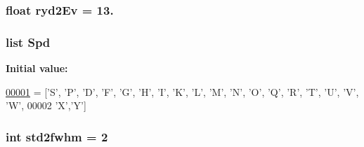 \subsubsection[{ryd2\+Ev}]{\setlength{\rightskip}{0pt plus 5cm}float ryd2\+Ev = 13.}\label{namespacepyneb_1_1utils_1_1__chianti__constants_a4b8a72e56d44f645b21c60a53b8a7c22}
\hypertarget{namespacepyneb_1_1utils_1_1__chianti__constants_aca66e52cd26761ab6aa375f99100d7c3}{}
\subsubsection[{Spd}]{\setlength{\rightskip}{0pt plus 5cm}list Spd}\label{namespacepyneb_1_1utils_1_1__chianti__constants_aca66e52cd26761ab6aa375f99100d7c3}
{\bfseries Initial value\+:}
\begin{DoxyCode}
\hypertarget{namespacepyneb_1_1utils_1_1__chianti__constants_l00001}{}\hyperlink{namespacepyneb_1_1utils_1_1__chianti__constants}{00001} = [\textcolor{stringliteral}{'S'}, \textcolor{stringliteral}{'P'}, \textcolor{stringliteral}{'D'}, \textcolor{stringliteral}{'F'}, \textcolor{stringliteral}{'G'}, \textcolor{stringliteral}{'H'}, \textcolor{stringliteral}{'I'}, \textcolor{stringliteral}{'K'}, \textcolor{stringliteral}{'L'}, \textcolor{stringliteral}{'M'}, \textcolor{stringliteral}{'N'}, \textcolor{stringliteral}{'O'}, \textcolor{stringliteral}{'Q'}, \textcolor{stringliteral}{'}\textcolor{stringliteral}{R', '}T', '\textcolor{stringliteral}{U', '}V', 'W',
00002        \textcolor{stringliteral}{'X'},\textcolor{stringliteral}{'Y'}]
\end{DoxyCode}
\hypertarget{namespacepyneb_1_1utils_1_1__chianti__constants_a3cf8d02c2baac605eea6a96d202064ee}{}
\subsubsection[{std2fwhm}]{\setlength{\rightskip}{0pt plus 5cm}int std2fwhm = 2}\label{namespacepyneb_1_1utils_1_1__chianti__constants_a3cf8d02c2baac605eea6a96d202064ee}
\hypertarget{namespacepyneb_1_1utils_1_1__chianti__constants_a27da4635b538de818335080d4083dc22}{}
